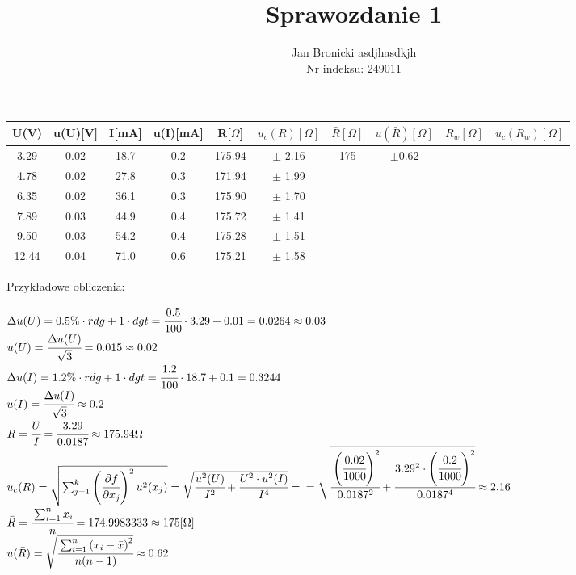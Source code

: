 \documentclass{article}
\title{Sprawozdanie 1}
\author{Jan Bronicki asdjhasdkjh\\
Nr indeksu: 249011}
\date{}
\begin{document}
\maketitle



\begin{center}
    \renewcommand{\arraystretch}{1.3}
\begin{tabular}{ |c|c|c|c|c|c|c|c|c|c| }
    \hline
    U(V)&u(U)[V]&I[mA]&u(I)[mA]&R[$\Omega$]&$u_c(R)[\Omega]$&$\bar{R}[\Omega]$&$u(\bar{R})[\Omega]$&$R_w[\Omega]$&$u_c(R_w)[\Omega]$ \\
    \hline \hline
    3.29&0.02&18.7&0.2&175.94&$\pm$ 2.16& \multirow{6}{*}{175}&\multirow{6}{*}{$\pm$0.62}&&\\ 
    \cline{1-6}
    \cline{9-10}
    4.78&0.02&27.8&0.3&171.94&$\pm$ 1.99&&&&\\ 
    \cline{1-6}
    \cline{9-10}
    6.35&0.02&36.1&0.3&175.90&$\pm$ 1.70&&&&\\ 
    \cline{1-6}
    \cline{9-10}
    7.89&0.03&44.9&0.4&175.72&$\pm$ 1.41&&&&\\ 
    \cline{1-6}
    \cline{9-10}
    9.50&0.03&54.2&0.4&175.28&$\pm$ 1.51&&&&\\ 
    \cline{1-6}
    \cline{9-10}
    12.44&0.04&71.0&0.6&175.21&$\pm$ 1.58&&&&\\ 
    \hline
\end{tabular}
\end{center}
Przykładowe obliczenia:
\begin{center}
    $\Delta u(U)  = 0.5\% \cdot rdg+1 \cdot dgt=\cfrac{0.5}{100} \cdot 3.29 + 0.01=0.0264\approx0.03$\\
    $u(U)=\cfrac{\Delta u(U)}{\sqrt{3}}=0.015\approx0.02$\\
    $\Delta u(I) = 1.2\% \cdot rdg+1 \cdot dgt = \cfrac{1.2}{100} \cdot 18.7 +0.1 =0.3244$\\
    $u(I)= \cfrac{\Delta u(I)}{\sqrt{3}} \approx 0.2$\\
    $R=\cfrac{U}{I} = \cfrac{3.29}{0.0187} \approx 175.94 \Omega$\\
    $u_c (R)=\sqrt{\sum_{j=1}^{k}\left( \cfrac{\partial f}{\partial x_j}\right)^2 u^2 (x_j)}
    =\sqrt{\cfrac{u^2 (U)}{I^2} + \cfrac{U^2 \cdot u^2 (I)}{I^4}}=$
    $= \sqrt{\cfrac{\left(\cfrac{0.02}{1000}\right)^2}{0.0187^2} + \cfrac{3.29^2 \cdot \left(\cfrac{0.2}{1000}\right)^2}{0.0187^4}}\approx 2.16$\\
    $\bar{R} = \cfrac{\sum_{i=1}^{n}x_i}{n}=174.9983333 \approx 175[\Omega]$\\
    $u(\bar{R}) = \sqrt{\cfrac{\sum_{i=1}^{n} \left(x_i - \bar{x} \right)^2}{n(n-1)}}\approx 0.62$\\

\end{center}
\end{document}
